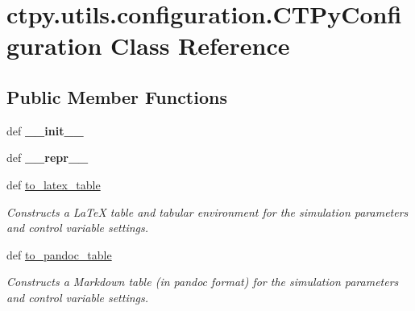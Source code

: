 \hypertarget{classctpy_1_1utils_1_1configuration_1_1_c_t_py_configuration}{\section{ctpy.\-utils.\-configuration.\-C\-T\-Py\-Configuration Class Reference}
\label{classctpy_1_1utils_1_1configuration_1_1_c_t_py_configuration}
}
\subsection*{Public Member Functions}
\begin{DoxyCompactItemize}
\item 
\hypertarget{classctpy_1_1utils_1_1configuration_1_1_c_t_py_configuration_adbb9201a49e6b4c5feaaf1cb31a5eb3b}{def {\bfseries \-\_\-\-\_\-init\-\_\-\-\_\-}}\label{classctpy_1_1utils_1_1configuration_1_1_c_t_py_configuration_adbb9201a49e6b4c5feaaf1cb31a5eb3b}

\item 
\hypertarget{classctpy_1_1utils_1_1configuration_1_1_c_t_py_configuration_af70073aca0f56ad01a38c56a712c4ece}{def {\bfseries \-\_\-\-\_\-repr\-\_\-\-\_\-}}\label{classctpy_1_1utils_1_1configuration_1_1_c_t_py_configuration_af70073aca0f56ad01a38c56a712c4ece}

\item 
def \hyperlink{classctpy_1_1utils_1_1configuration_1_1_c_t_py_configuration_abed8bebe92b3bc48b3ed87c64e102f35}{to\-\_\-latex\-\_\-table}
\begin{DoxyCompactList}\small\item\em Constructs a La\-Te\-X table and tabular environment for the simulation parameters and control variable settings. \end{DoxyCompactList}\item 
def \hyperlink{classctpy_1_1utils_1_1configuration_1_1_c_t_py_configuration_a3693c03da84920bc9f8a0d77f4e7f976}{to\-\_\-pandoc\-\_\-table}
\begin{DoxyCompactList}\small\item\em Constructs a Markdown table (in pandoc format) for the simulation parameters and control variable settings. \end{DoxyCompactList}\end{DoxyCompactItemize}
